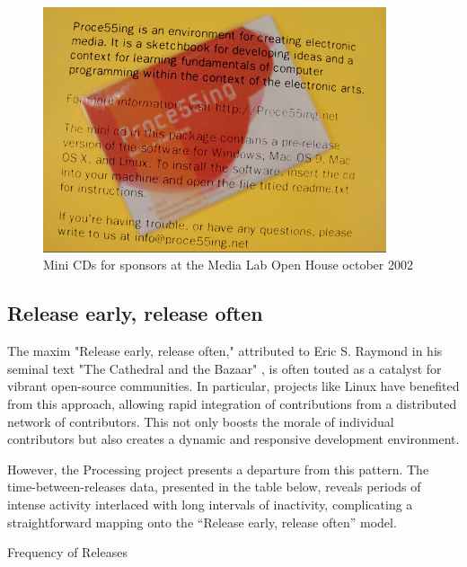 
\begin{figure}
	\centering
	\includegraphics[width=0.9\textwidth]{images/processing-mini-cd.png}
	\caption{Mini CDs for sponsors at the Media Lab Open House october 2002}
	\label{fig:processing-cd}
\end{figure}
\subsection{Release early, release often}
The maxim "Release early, release often," attributed to Eric S. Raymond in his seminal text "The Cathedral and the Bazaar" \parencite{raymondCathedralBazaar1999}, is often touted as a catalyst for vibrant open-source communities. In particular, projects like Linux have benefited from this approach, allowing rapid integration of contributions from a distributed network of contributors. This not only boosts the morale of individual contributors but also creates a dynamic and responsive development environment.

However, the Processing project presents a departure from this pattern. The time-between-releases data, presented in the table below, reveals periods of intense activity interlaced with long intervals of inactivity, complicating a straightforward mapping onto the “Release early, release often” model.

\changepapersize{305.3mm:210mm}

{
	\LARGE
	\noindent Frequency of Releases\par
	\vspace{0.2cm} 
}

